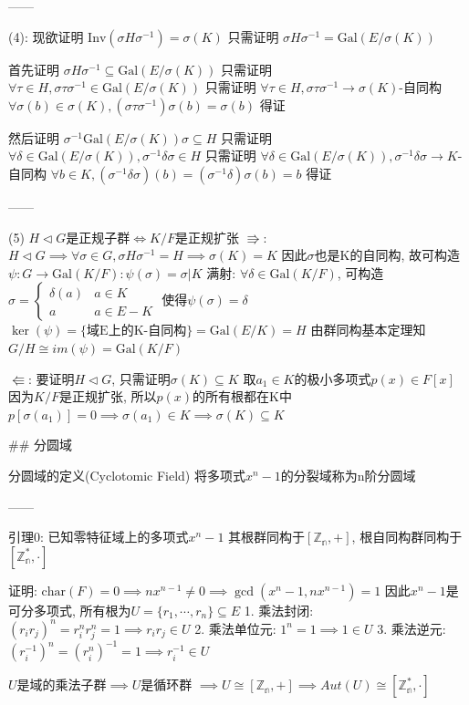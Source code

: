 ------

(4): 现欲证明 $\text{Inv}(\sigma H\sigma^{-1})=\sigma(K)$
只需证明 $\sigma H\sigma^{-1}=\text{Gal}(E/\sigma(K))$

首先证明 $\sigma H\sigma^{-1}\subseteq\text{Gal}(E/\sigma(K))$
只需证明 $\forall\tau\in H,\sigma\tau\sigma^{-1}\in\text{Gal}(E/\sigma(K))$
只需证明 $\forall\tau\in H,\sigma\tau\sigma^{-1}\to\sigma(K)$-自同构
$\forall\sigma(b)\in\sigma(K),(\sigma\tau\sigma^{-1})\sigma(b)=\sigma(b)$ 得证

然后证明 $\sigma^{-1}\text{Gal}(E/\sigma(K))\sigma\subseteq H$
只需证明 $\forall\delta\in\text{Gal}(E/\sigma(K)),\sigma^{-1}\delta\sigma\in H$
只需证明 $\forall\delta\in\text{Gal}(E/\sigma(K)),\sigma^{-1}\delta\sigma\to K$-自同构
$\forall b\in K,(\sigma^{-1}\delta\sigma)(b)=(\sigma^{-1}\delta)\sigma(b)=b$ 得证

------

(5) $H\lhd G$是正规子群$\iff K/F$是正规扩张
$\Rrightarrow$: $H\lhd G\implies\forall\sigma\in G,\sigma H\sigma^{-1}=H\implies\sigma(K)=K$
因此$\sigma$也是K的自同构, 故可构造 $\psi:G\to\text{Gal}(K/F):\psi(\sigma)=\sigma|K$
满射: $\forall\delta\in\text{Gal}(K/F)$, 可构造$\sigma=\begin{cases}\delta(a)&a\in K\\a&a\in E-K\end{cases}$ 使得$\psi(\sigma)=\delta$
$\ker(\psi)=\{\text{域E上的K-自同构}\}=\text{Gal}(E/K)=H$
由群同构基本定理知 $G/H\cong im(\psi)=\text{Gal}(K/F)$

$\Lleftarrow$: 要证明$H\lhd G$, 只需证明$\sigma(K)\subseteq K$
取$a_1\in K$的极小多项式$p(x)\in F[x]$
因为$K/F$是正规扩张, 所以$p(x)$的所有根都在K中
$p[\sigma(a_1)]=0\implies\sigma(a_1)\in K\implies \sigma(K)\subseteq K$

## 分圆域

分圆域的定义(Cyclotomic Field)
将多项式$x^n-1$的分裂域称为n阶分圆域

------

引理0: 已知零特征域上的多项式$x^n-1$
其根群同构于$[\mathbb{Z_n},+]$, 根自同构群同构于$[\mathbb{Z_n^*},\cdot]$

证明: $\text{char}(F)=0\implies nx^{n-1}\neq0\implies\gcd(x^n-1,nx^{n-1})=1$
因此$x^n-1$是可分多项式, 所有根为$U=\{r_1,\cdots,r_n\}\subseteq E$
1. 乘法封闭: $(r_ir_j)^n=r_i^nr_j^n=1\implies r_ir_j\in U$
2. 乘法单位元: $1^n=1\implies1\in U$
3. 乘法逆元: $(r_i^{-1})^n=(r_i^n)^{-1}=1\implies r_i^{-1}\in U$

$U$是域的乘法子群$\implies U$是循环群
$\implies U\cong[\mathbb{Z_n},+]\implies Aut(U)\cong[\mathbb{Z_n^*},\cdot]$

